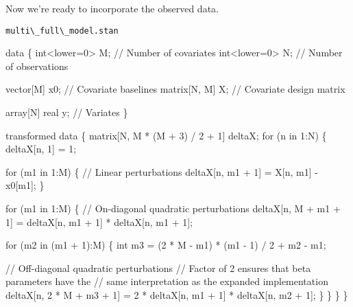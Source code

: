\documentclass[
  letterpaper,
  DIV=11,
  numbers=noendperiod]{scrartcl}
\newenvironment{Shaded}{\begin{snugshade}}{\end{snugshade}}
\newcommand{\CommentTok}[1]{\textcolor[rgb]{0.37,0.37,0.37}{#1}}
\newcommand{\ControlFlowTok}[1]{\textcolor[rgb]{0.00,0.23,0.31}{#1}}
\newcommand{\DataTypeTok}[1]{\textcolor[rgb]{0.68,0.00,0.00}{#1}}
\newcommand{\DecValTok}[1]{\textcolor[rgb]{0.68,0.00,0.00}{#1}}
\newcommand{\KeywordTok}[1]{\textcolor[rgb]{0.00,0.23,0.31}{#1}}
\newcommand{\NormalTok}[1]{\textcolor[rgb]{0.00,0.23,0.31}{#1}}
\begin{document}
Now we're ready to incorporate the observed data.

\begin{codelisting}

\caption{\texttt{multi\textbackslash\_full\textbackslash\_model.stan}}

\begin{Shaded}
\begin{Highlighting}[]
\KeywordTok{data}\NormalTok{ \{}
  \DataTypeTok{int}\NormalTok{\textless{}}\KeywordTok{lower}\NormalTok{=}\DecValTok{0}\NormalTok{\textgreater{} M;  }\CommentTok{// Number of covariates}
  \DataTypeTok{int}\NormalTok{\textless{}}\KeywordTok{lower}\NormalTok{=}\DecValTok{0}\NormalTok{\textgreater{} N;  }\CommentTok{// Number of observations}
  
  \DataTypeTok{vector}\NormalTok{[M] x0;    }\CommentTok{// Covariate baselines}
  \DataTypeTok{matrix}\NormalTok{[N, M] X;  }\CommentTok{// Covariate design matrix}
  
  \DataTypeTok{array}\NormalTok{[N] }\DataTypeTok{real}\NormalTok{ y; }\CommentTok{// Variates}
\NormalTok{\}}

\KeywordTok{transformed data}\NormalTok{ \{}
  \DataTypeTok{matrix}\NormalTok{[N, M * (M + }\DecValTok{3}\NormalTok{) / }\DecValTok{2}\NormalTok{ + }\DecValTok{1}\NormalTok{] deltaX;}
  \ControlFlowTok{for}\NormalTok{ (n }\ControlFlowTok{in} \DecValTok{1}\NormalTok{:N) \{}
\NormalTok{    deltaX[n, }\DecValTok{1}\NormalTok{] = }\DecValTok{1}\NormalTok{;}
    
    \ControlFlowTok{for}\NormalTok{ (m1 }\ControlFlowTok{in} \DecValTok{1}\NormalTok{:M) \{}
      \CommentTok{// Linear perturbations}
\NormalTok{      deltaX[n, m1 + }\DecValTok{1}\NormalTok{] = X[n, m1] {-} x0[m1];}
\NormalTok{    \}}
    
    \ControlFlowTok{for}\NormalTok{ (m1 }\ControlFlowTok{in} \DecValTok{1}\NormalTok{:M) \{}
      \CommentTok{// On{-}diagonal quadratic perturbations}
\NormalTok{      deltaX[n, M + m1 + }\DecValTok{1}\NormalTok{] }
\NormalTok{        = deltaX[n, m1 + }\DecValTok{1}\NormalTok{] * deltaX[n, m1 + }\DecValTok{1}\NormalTok{];}
  
      \ControlFlowTok{for}\NormalTok{ (m2 }\ControlFlowTok{in}\NormalTok{ (m1 + }\DecValTok{1}\NormalTok{):M) \{}
        \DataTypeTok{int}\NormalTok{ m3 = (}\DecValTok{2}\NormalTok{ * M {-} m1) * (m1 {-} }\DecValTok{1}\NormalTok{) / }\DecValTok{2}\NormalTok{ + m2 {-} m1;}
          
        \CommentTok{// Off{-}diagonal quadratic perturbations}
        \CommentTok{// Factor of 2 ensures that beta parameters have the}
        \CommentTok{// same interpretation as the expanded implementation}
\NormalTok{        deltaX[n, }\DecValTok{2}\NormalTok{ * M + m3 + }\DecValTok{1}\NormalTok{] }
\NormalTok{          = }\DecValTok{2}\NormalTok{ * deltaX[n, m1 + }\DecValTok{1}\NormalTok{] * deltaX[n, m2 + }\DecValTok{1}\NormalTok{];}
\NormalTok{      \}}
\NormalTok{    \}}
\NormalTok{  \}}
\NormalTok{\}}


\end{Highlighting}
\end{Shaded}
\end{codelisting}
\end{document}
